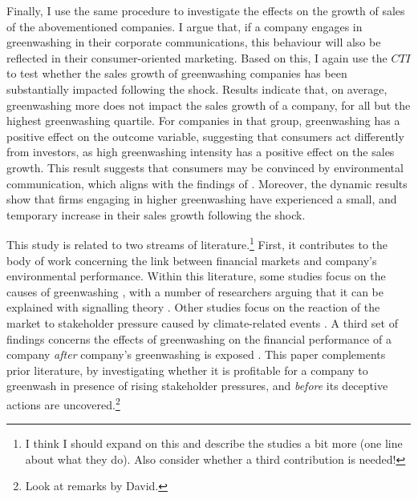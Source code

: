 \documentclass[12pt]{article}
\begin{document}
Finally, I use the same procedure to investigate the effects on the growth of sales of the abovementioned companies. I argue that, if a company engages in greenwashing in their corporate communications, this behaviour will also be reflected in their consumer-oriented marketing. Based on this, I again use the $CTI$ to test whether the sales growth of greenwashing companies has been substantially impacted following the shock. Results indicate that, on average, greenwashing more does not impact the sales growth of a company, for all but the highest greenwashing quartile. For companies in that group, greenwashing has a positive effect on the outcome variable, suggesting that consumers act differently from investors, as high greenwashing intensity has a positive effect on the sales growth. This result suggests that consumers may be convinced by environmental communication, which aligns with the findings of \textcite{schmuckMisleadingConsumersGreen2018,parguelCanEvokingNature2015}. Moreover, the dynamic results show that firms engaging in higher greenwashing have experienced a small, and temporary increase in their sales growth following the shock. 

This study is related to two streams of literature.\footnote{I think I should expand on this and describe the studies a bit more (one line about what they do). Also consider whether a third contribution is needed!} First, it contributes to the body of work concerning the link between financial markets and company's environmental performance. Within this literature, some studies focus on the causes of greenwashing \parencite{servaesImpactCorporateSocial2013,berroneDoesGreenwashingPay2017,kimGreenwashVsBrownwash2015,testaDoesItPay2018}, with a number of researchers arguing that it can be explained with signalling theory \parencite{lyonGreenwashCorporateEnvironmental2011,wuBadGreenwashingGood2020}. Other studies focus on the reaction of the market to stakeholder pressure caused by climate-related events \parencite{birindelliJustBlahBlah2023,schusterStockPriceReactions2023, diaz-raineyTrumpVsParis2021, bouzzineStockPriceReactions2021,cartellierCanInvestorsCurb2023, }. A third set of findings concerns the effects of greenwashing on the financial performance of a company \textit{after} company's greenwashing is exposed \parencite{tetiDoesGreenwashingAffect2024, karpoffReputationalPenaltiesEnvironmental2005, konarDoesMarketValue2001,torelliGreenwashingEnvironmentalCommunication2020}. This paper complements prior literature, by investigating whether it is profitable for a company to greenwash in presence of rising stakeholder pressures, and \textit{before} its deceptive actions are uncovered.\footnote{Look at remarks by David.}
\end{document}

